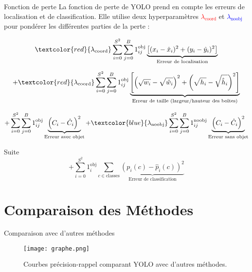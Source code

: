 \documentclass{beamer}
\begin{document}

\begin{frame}{Fonction de perte}
    La fonction de perte de YOLO prend en compte les erreurs de localisation et de classification. 
    Elle utilise deux hyperparamètres \textcolor{red}{$\lambda_{\text{coord}}$} et \textcolor{blue}{$\lambda_{\text{noobj}}$} pour pondérer les différentes parties de la perte :\pause

    \begin{equation}
    \textcolor{red}{\lambda_{\text{coord}}} \sum_{i=0}^{S^2} \sum_{j=0}^{B} 1^{\text{obj}}_{ij} 
    \underbrace{\left[(x_i - \hat{x}_i)^2 + (y_i - \hat{y}_i)^2\right]}_{\text{Erreur de localisation}}
    \end{equation}\pause

    \begin{equation}
    + \textcolor{red}{\lambda_{\text{coord}}} \sum_{i=0}^{S^2} \sum_{j=0}^{B} 1^{\text{obj}}_{ij}
    \underbrace{\left[\left(\sqrt{w_i} - \sqrt{\hat{w}_i}\right)^2 + \left(\sqrt{h_i} - \sqrt{\hat{h}_i}\right)^2 \right]}_{\text{Erreur de taille (largeur/hauteur des boîtes)}}
    \end{equation}\pause

    \begin{equation}
    + \sum_{i=0}^{S^2} \sum_{j=0}^{B} 1^{\text{obj}}_{ij}
    \underbrace{\left(C_i - \hat{C}_i\right)^2}_{\text{Erreur avec objet}}
    + \textcolor{blue}{\lambda_{\text{noobj}}} \sum_{i=0}^{S^2} \sum_{j=0}^{B} 1^{\text{noobj}}_{ij}
    \underbrace{\left(C_i - \hat{C}_i\right)^2}_{\text{Erreur sans objet}}
    \end{equation}
\end{frame}
\begin{frame}{Suite}
    \begin{equation}
    + \sum_{i=0}^{S^2} 1^{\text{obj}}_i \sum_{c \in \text{classes}} 
    \underbrace{\left(p_i(c) - \hat{p}_i(c)\right)^2}_{\text{Erreur de classification}}
    \end{equation}
\end{frame}


\section{Comparaison des Méthodes}
\begin{frame}{Comparaison avec d'autres méthodes}
    \begin{figure}
        \centering
        \texttt{[image: graphe.png]}
        \caption{Courbes précision-rappel comparant YOLO avec d'autres méthodes.}
    \end{figure}
\end{frame}
\end{document}
